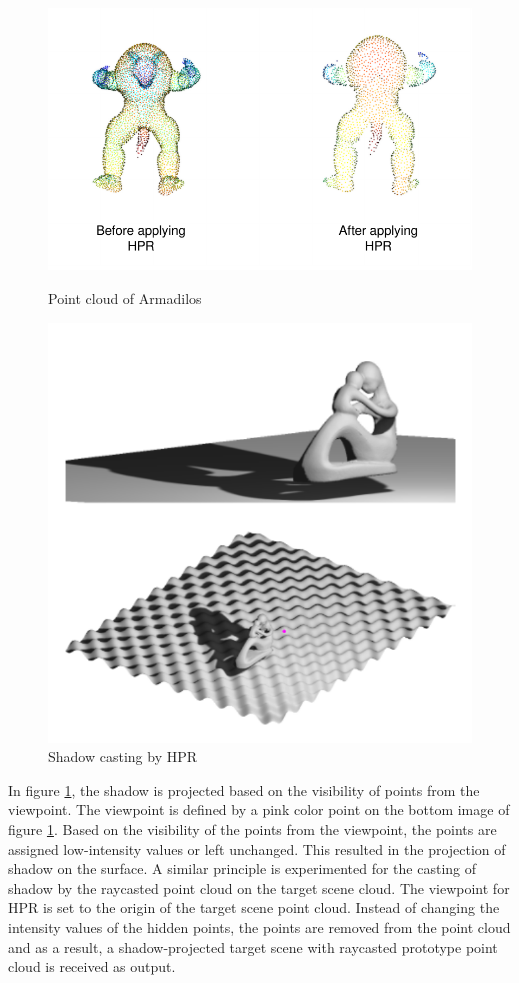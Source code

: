 \begin{figure}[htbp]
    \centering
    \begin{minipage}[b]{0.45\textwidth}
    \centering
    \includegraphics[width=0.5\linewidth]{97_graphics/concepts/shadowcasting_from_paper.pdf}
    \caption{Point cloud of Armadilos \parencite{open3d}}
    \label{fig:shadow_casting}
    \end{minipage}
    \hfill
    \begin{minipage}[b]{0.45\textwidth}
    \centering
    \includegraphics[width=0.5\linewidth]{97_graphics/concepts/hpr_reference_output.pdf}
    \caption{Shadow casting by HPR \parencite{katz2007}}
    \label{fig:hpr_reference_output}
    \end{minipage}
\end{figure}

In figure \ref{fig:hpr_reference_output}, the shadow is projected based on the visibility of points from the viewpoint. The viewpoint is defined by a pink color point on the bottom image of figure \ref{fig:hpr_reference_output}. Based on the visibility of the points from the viewpoint, the points are assigned low-intensity values or left unchanged. This resulted in the projection of shadow on the surface.
A similar principle is experimented for the casting of shadow by the raycasted point cloud on the target scene cloud. The viewpoint for HPR is set to the origin of the target scene point cloud. Instead of changing the intensity values of the hidden points, the points are removed from the point cloud and as a result, a shadow-projected target scene with raycasted prototype point cloud is received as output. 

